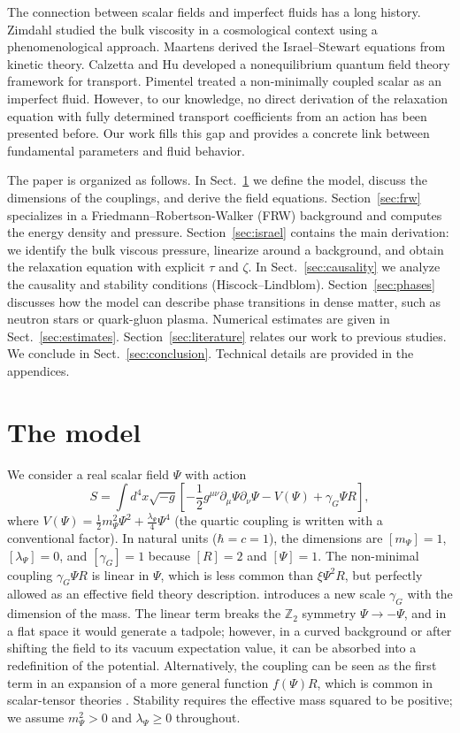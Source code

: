 \documentclass[aps,prd,reprint,superscriptaddress,floatfix]{revtex4-2}
\begin{document}
The connection between scalar fields and imperfect fluids has a long history. Zimdahl \cite{Zimdahl} studied the bulk viscosity in a cosmological context using a phenomenological approach. Maartens \cite{Maartens} derived the Israel--Stewart equations from kinetic theory. Calzetta and Hu \cite{CalzettaHu} developed a nonequilibrium quantum field theory framework for transport. Pimentel \cite{Pimentel} treated a non-minimally coupled scalar as an imperfect fluid. However, to our knowledge, no direct derivation of the relaxation equation with fully determined transport coefficients from an action has been presented before. Our work fills this gap and provides a concrete link between fundamental parameters and fluid behavior.

The paper is organized as follows. In Sect.~\ref{sec:model} we define the model, discuss the dimensions of the couplings, and derive the field equations. Section~\ref{sec:frw} specializes in a Friedmann--Robertson-Walker (FRW) background and computes the energy density and pressure. Section~\ref{sec:israel} contains the main derivation: we identify the bulk viscous pressure, linearize around a background, and obtain the relaxation equation with explicit $\tau$ and $\zeta$. In Sect.~\ref{sec:causality} we analyze the causality and stability conditions (Hiscock--Lindblom). Section~\ref{sec:phases} discusses how the model can describe phase transitions in dense matter, such as neutron stars or quark-gluon plasma. Numerical estimates are given in Sect.~\ref{sec:estimates}. Section~\ref{sec:literature} relates our work to previous studies. We conclude in Sect.~\ref{sec:conclusion}. Technical details are provided in the appendices.

\section{The model}
\label{sec:model}

We consider a real scalar field $\Psi$ with action
\begin{equation}
S = \int d^4x\sqrt{-g}\left[ -\frac12 g^{\mu\nu}\partial_\mu\Psi\partial_\nu\Psi - V(\Psi) + \gamma_G\Psi R \right],
\label{eq:action}
\end{equation}
where $V(\Psi) = \frac12 m_\Psi^2\Psi^2 + \frac{\lambda_\Psi}{4}\Psi^4$ (the quartic coupling is written with a conventional factor). In natural units ($\hbar=c=1$), the dimensions are $[m_\Psi]=1$, $[\lambda_\Psi]=0$, and $[\gamma_G]=1$ because $[R]=2$ and $[\Psi]=1$. The non-minimal coupling $\gamma_G\Psi R$ is linear in $\Psi$, which is less common than $\xi\Psi^2R$, but perfectly allowed as an effective field theory description. introduces a new scale $\gamma_G$ with the dimension of the mass. The linear term breaks the $\mathbb{Z}_2$ symmetry $\Psi\to-\Psi$, and in a flat space it would generate a tadpole; however, in a curved background or after shifting the field to its vacuum expectation value, it can be absorbed into a redefinition of the potential. Alternatively, the coupling can be seen as the first term in an expansion of a more general function $f(\Psi)R$, which is common in scalar-tensor theories \cite{Faraoni}. Stability requires the effective mass squared to be positive; we assume $m_\Psi^2>0$ and $\lambda_\Psi\ge0$ throughout.
\end{document}
